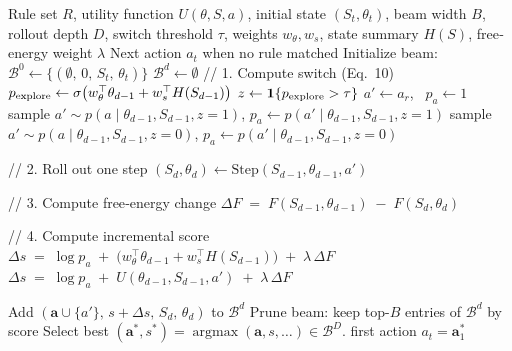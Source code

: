 \documentclass{article} %
\begin{document}
\begin{algorithm}[htbp]
\caption{Beam Search for Action Sequence Forward Planning}
\label{alg:beam-search}
\begin{algorithmic}[1]
\Require Rule set $R$, utility function $U(\theta,S,a)$, initial state $(S_t,\theta_t)$, beam width $B$, rollout depth $D$, switch threshold $\tau$, weights $w_\theta,w_s$, state summary $H(S)$, free‐energy weight $\lambda$
\Ensure Next action $a_t$ when no rule matched
\State Initialize beam:
  $\mathcal{B}^0 \gets \{(\emptyset,\,0,\,S_t,\,\theta_t)\}$
  \State $\mathcal{B}^d \gets \emptyset$
    \State // 1. Compute switch (Eq.~10)
    \State $p_{\rm explore}\gets \sigma\bigl(w_\theta^\top\theta_{d-1}+w_s^\top H(S_{d-1})\bigr)$
    \State $z\gets\mathbf{1}\{p_{\rm explore}>\tau\}$
      \State $a'\gets a_r$, \ $p_a\gets1$
    \Else
        
        \State sample $a'\sim p(a\mid\theta_{d-1},S_{d-1},z=1)$,\quad
              $p_a\gets p(a'\mid\theta_{d-1},S_{d-1},z=1)$
      \Else      {}
        \State sample $a'\sim p(a\mid\theta_{d-1},S_{d-1},z=0)$,\quad
              $p_a\gets p(a'\mid\theta_{d-1},S_{d-1},z=0)$
      \EndIf
    \EndIf

    \State // 2. Roll out one step
    \State $(S_d,\theta_d)\gets\mathrm{Step}(S_{d-1},\theta_{d-1},a')$

    \State // 3. Compute free‐energy change
    \State $\displaystyle\Delta F \;=\; F(S_{d-1},\theta_{d-1}) \;-\; F(S_d,\theta_d)$

    \State // 4. Compute incremental score
      \State $\displaystyle\Delta s \;=\; \log p_a 
        \;+\;\bigl(w_\theta^\top\theta_{d-1}+w_s^\top H(S_{d-1})\bigr)
        \;+\;\lambda\,\Delta F$
    \Else
      \State $\displaystyle\Delta s \;=\; \log p_a 
        \;+\; U(\theta_{d-1},S_{d-1},a')
        \;+\;\lambda\,\Delta F$
    \EndIf

    \State Add $(\mathbf{a}\cup\{a'\},\,s+\Delta s,\,S_d,\,\theta_d)$ to $\mathcal{B}^d$
  \EndFor
  \State Prune beam: keep top-$B$ entries of $\mathcal{B}^d$ by score
\EndFor
\State Select best 
  $(\mathbf{a}^*,s^*) 
     = \mathop{\arg\max}{(\mathbf{a},s,\ldots)\in\mathcal B^D}$.
\State \Return first action $a_t=\mathbf{a}^*_1$
\end{algorithmic}
\end{algorithm}
\end{document}
